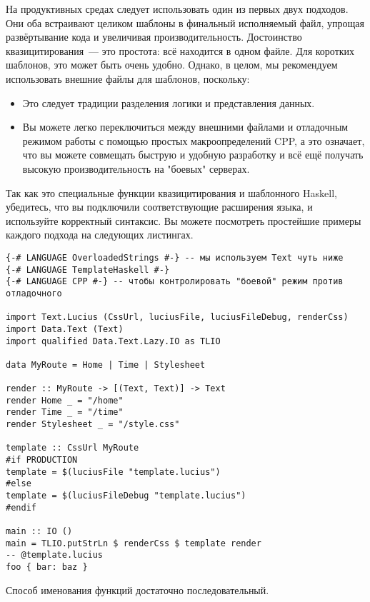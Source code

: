 На продуктивных средах следует использовать один из первых двух подходов.  Они
оба встраивают целиком шаблоны в финальный исполняемый файл, упрощая
развёртывание кода и увеличивая производительность.  Достоинство
квазицитирования~--- это простота: всё находится в одном файле.  Для коротких
шаблонов, это может быть очень удобно. Однако, в целом, мы рекомендуем
использовать внешние файлы для шаблонов, поскольку:
\begin{itemize}
    \item Это следует традиции разделения логики и представления данных.

    \item Вы можете легко переключиться между внешними файлами и отладочным
        режимом работы с помощью простых макроопределений CPP, а это означает,
        что вы можете совмещать быструю и удобную разработку и всё ещё получать
        высокую производительность на "боевых" серверах.
\end{itemize}

Так как это специальные функции квазицитирования и шаблонного Haskell,
убедитесь, что вы подключили соответствующие расширения языка, и используйте
корректный синтаксис. Вы можете посмотреть простейшие примеры каждого подхода
на следующих листингах.


\begin{lstlisting}
{-# LANGUAGE OverloadedStrings #-} -- мы используем Text чуть ниже
{-# LANGUAGE TemplateHaskell #-}
{-# LANGUAGE CPP #-} -- чтобы контролировать "боевой" режим против отладочного

import Text.Lucius (CssUrl, luciusFile, luciusFileDebug, renderCss)
import Data.Text (Text)
import qualified Data.Text.Lazy.IO as TLIO

data MyRoute = Home | Time | Stylesheet

render :: MyRoute -> [(Text, Text)] -> Text
render Home _ = "/home"
render Time _ = "/time"
render Stylesheet _ = "/style.css"

template :: CssUrl MyRoute
#if PRODUCTION
template = $(luciusFile "template.lucius")
#else
template = $(luciusFileDebug "template.lucius")
#endif

main :: IO ()
main = TLIO.putStrLn $ renderCss $ template render
-- @template.lucius
foo { bar: baz }
\end{lstlisting}

Способ именования функций достаточно последовательный.

